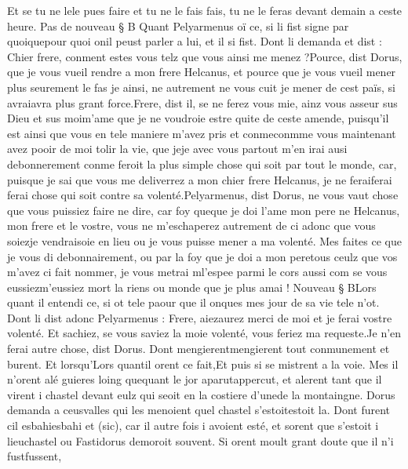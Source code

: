 \documentclass{article}
\begin{document}
\begin{pages}
      Et se tu ne lele pues faire et tu ne le fais fais, 
      tu ne le feras devant demain a ceste heure. \pend
\pstart Pas de nouveau § B
   Quant Pelyarmenus oï ce, si li fist signe 
   par quoiquepour quoi 
   onil peust parler a lui, et il si fist. Dont li demanda et dist :
   Chier frere, conment estes vous telz que vous ainsi me menez ?Pource, dist Dorus, que je vous vueil rendre a mon frere Helcanus, 
   et pource que je vous vueil mener plus seurement le fas je ainsi, ne autrement ne vous cuit je mener de cest païs, 
   si avraiavra plus grant force.Frere, dist il, se ne ferez vous mie, ainz vous asseur sus Dieu et sus 
      moim'ame que je ne voudroie estre quite 
      de ceste amende, puisqu’il est ainsi que vous en tele maniere m’avez pris et 
      conmeconmme vous maintenant avez pooir de moi tolir la vie, 
   que jeje avec vous partout m’en irai ausi debonnerement conme 
      feroit la plus simple chose qui soit par tout le monde, 
   car, puisque je sai que vous me deliverrez a mon chier frere Helcanus, 
      je ne feraiferai ferai chose qui soit contre sa volenté.Pelyarmenus, dist Dorus, 
      ne vous vaut chose que vous puissiez faire ne dire, car foy queque je doi 
   l’ame mon pere ne Helcanus, mon frere et le vostre,
      vous ne m’eschaperez autrement de ci adonc que 
      vous soiezje vendraisoie 
      en lieu ou je vous puisse mener a ma volenté. Mes faites ce que je vous di 
      debonnairement, ou par la foy que je doi a 
      mon peretous ceulz que vos m'avez ci fait nommer, 
      je vous metrai ml’espee parmi le cors aussi com se vous 
      eussiezm'eussiez mort la riens ou monde que je plus amai !
   Nouveau § BLors quant il entendi ce, si ot tele paour que il onques 
   mes jour de sa vie tele n’ot. 
   Dont li dist adonc Pelyarmenus :
   Frere, aiezaurez merci de moi 
      et je ferai vostre volenté. Et sachiez, se vous saviez la moie volenté, vous feriez ma requeste.Je n’en ferai autre chose, dist Dorus. 
   Dont mengierentmengierent tout conmunement et burent. 
   Et lorsqu’Lors quantil orent 
      ce fait,Et puis si se mistrent a la voie. 
   Mes il n’orent alé guieres loing quequant le jor 
   aparutappercut, 
   et alerent tant que il virent i chastel devant eulz 
   qui seoit en la costiere d’unede la montaingne. 
   Dorus demanda a ceusvalles qui les menoient 
   quel chastel s’estoitestoit la. 
   Dont furent cil esbahiesbahi et (sic), 
   car il autre fois i avoient esté, 
      et sorent que s’estoit i 
   lieuchastel ou 
      Fastidorus demoroit souvent. Si orent moult grant doute que 
   il n’i fustfussent, 

\end{pages}
\end{document}
